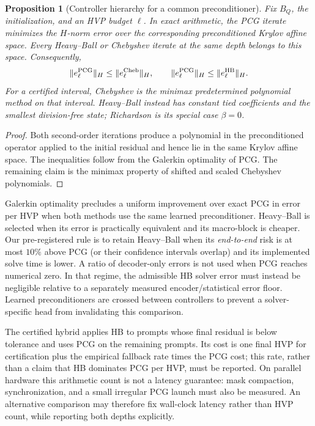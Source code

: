 \documentclass[11pt]{article}
\newtheorem{proposition}{Proposition}
\begin{document}
\begin{proposition}[Controller hierarchy for a common preconditioner]
Fix $B_Q$, the initialization, and an HVP budget $\ell$.  In exact arithmetic,
the PCG iterate minimizes the $H$-norm error over the corresponding
preconditioned Krylov affine space.  Every Heavy--Ball or Chebyshev iterate at
the same depth belongs to this space.  Consequently,
\[
 \|e_\ell^{\rm PCG}\|_H
 \leq \|e_\ell^{\rm Cheb}\|_H,
 \qquad
 \|e_\ell^{\rm PCG}\|_H
 \leq \|e_\ell^{\rm HB}\|_H.
\]
For a certified interval, Chebyshev is the minimax predetermined polynomial
method on that interval.  Heavy--Ball instead has constant tied coefficients
and the smallest division-free state; Richardson is its special case
$\beta=0$.
\end{proposition}
\begin{proof}
Both second-order iterations produce a polynomial in the preconditioned
operator applied to the initial residual and hence lie in the same Krylov
affine space.  The inequalities follow from the Galerkin optimality of PCG.
The remaining claim is the minimax property of shifted and scaled Chebyshev
polynomials.
\end{proof}

Galerkin optimality precludes a uniform improvement over exact PCG in error
per HVP when both methods use the same learned preconditioner.  Heavy--Ball is
selected when its error is practically equivalent and its macro-block is
cheaper.  Our
pre-registered rule is to retain Heavy--Ball when its \emph{end-to-end} risk is
at most $10\%$ above PCG (or their confidence intervals overlap) and its
implemented solve time is lower.  A ratio of decoder-only errors is not used
when PCG reaches numerical zero.  In that regime, the admissible HB solver
error must instead be negligible relative to a separately measured
encoder/statistical error floor.  Learned preconditioners are crossed between
controllers to prevent a solver-specific head from invalidating this
comparison.

The certified hybrid applies HB to prompts whose final residual is below
tolerance and uses PCG on the remaining prompts.  Its cost is one final HVP
for certification plus the empirical fallback rate times the PCG cost; this
rate, rather than a claim that HB dominates PCG per HVP, must be reported.
On parallel hardware this arithmetic count is not a latency guarantee:
mask compaction, synchronization, and a small irregular PCG launch must also
be measured.  An alternative comparison may therefore fix wall-clock latency
rather than HVP count, while reporting both depths explicitly.
\end{document}
